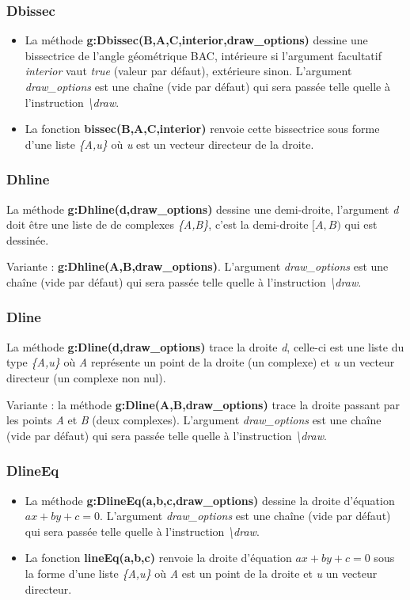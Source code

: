 \documentclass[%
10pt,%
a4paper,%
french,%
]%
{article}%
\begin{document}
\subsubsection{Dbissec}
\begin{itemize}
    \item La méthode \textbf{g:Dbissec(B,A,C,interior,draw\_options)} dessine une bissectrice de l'angle géométrique BAC, intérieure si l'argument facultatif \emph{interior} vaut \emph{true} (valeur par défaut), extérieure sinon. L'argument \emph{draw\_options} est une chaîne (vide par défaut) qui sera passée telle quelle à l'instruction
  \emph{\textbackslash draw}.
  \item La fonction \textbf{bissec(B,A,C,interior)} renvoie cette bissectrice sous forme d'une liste \emph{\{A,u\}} où \emph{u} est un vecteur directeur de la droite.
\end{itemize}

\subsubsection{Dhline}
La méthode \textbf{g:Dhline(d,draw\_options)} dessine une demi-droite, l'argument \emph{d} doit être une liste de de complexes \emph{\{A,B\}}, c'est la demi-droite $[A,B)$ qui est dessinée.

Variante : \textbf{g:Dhline(A,B,draw\_options)}. L'argument \emph{draw\_options} est une chaîne (vide par défaut) qui sera passée telle quelle à l'instruction \emph{\textbackslash draw}.

\subsubsection{Dline}
La méthode \textbf{g:Dline(d,draw\_options)} trace la droite \emph{d}, celle-ci est une liste du type \emph{\{A,u\}} où \emph{A} représente un point de la droite (un complexe) et \emph{u} un vecteur directeur (un complexe non nul). 

Variante : la méthode \textbf{g:Dline(A,B,draw\_options)} trace la droite passant par les points \emph{A} et \emph{B} (deux complexes). L'argument \emph{draw\_options} est une chaîne (vide par défaut) qui sera passée telle quelle à l'instruction \emph{\textbackslash draw}.

\subsubsection{DlineEq}
\begin{itemize}
    \item La méthode \textbf{g:DlineEq(a,b,c,draw\_options)} dessine la droite d'équation \(ax+by+c=0\). L'argument \emph{draw\_options} est une chaîne (vide par défaut) qui sera passée telle quelle à l'instruction \emph{\textbackslash draw}.
    \item La fonction \textbf{lineEq(a,b,c)} renvoie la droite d'équation \(ax+by+c=0\) sous la forme d'une liste \emph{\{A,u\}} où \emph{A} est un point de la droite et \emph{u} un vecteur directeur.
\end{itemize}
\end{document}
